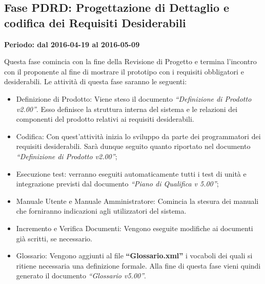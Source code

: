 \documentclass[../PianoProgetto.tex]{subfiles}
\begin{document}
	\subsection{Fase PDRD: Progettazione di Dettaglio e codifica dei Requisiti Desiderabili}
		\textbf{Periodo: dal 2016-04-19 al 2016-05-09}
		
		Questa fase comincia con la fine della Revisione di Progetto e termina l’incontro con il proponente al fine di mostrare il prototipo con i requisiti obbligatori e desiderabili. Le attività di questa fase saranno le seguenti:

		\begin{itemize}
			\item Definizione di Prodotto: Viene steso il documento \textit{“Definizione di Prodotto v2.00”}. Esso definisce la struttura interna del sistema e le relazioni dei componenti del prodotto relativi ai requisiti desiderabili.

			\item Codifica: Con quest’attività inizia lo sviluppo da parte dei programmatori dei requisiti desiderabili. Sarà dunque seguito quanto riportato nel documento \textit{“Definizione di Prodotto v2.00”};

	 		\item Esecuzione test: verranno eseguiti automaticamente tutti i test di unità e integrazione previsti dal documento \textit{“Piano di Qualifica v 5.00”};

			\item Manuale Utente e Manuale Amministratore: Comincia la stesura dei manuali che forniranno indicazioni agli utilizzatori del sistema.

			\item Incremento e Verifica Documenti: Vengono eseguite modifiche ai documenti già scritti, se necessario.

			\item Glossario: Vengono aggiunti al file \textbf{“Glossario.xml”} i vocaboli dei quali si ritiene necessaria una definizione formale. Alla fine di questa fase vieni quindi generato il documento \textit{“Glossario v5.00”}.
		\end{itemize}
		
\end{document}
